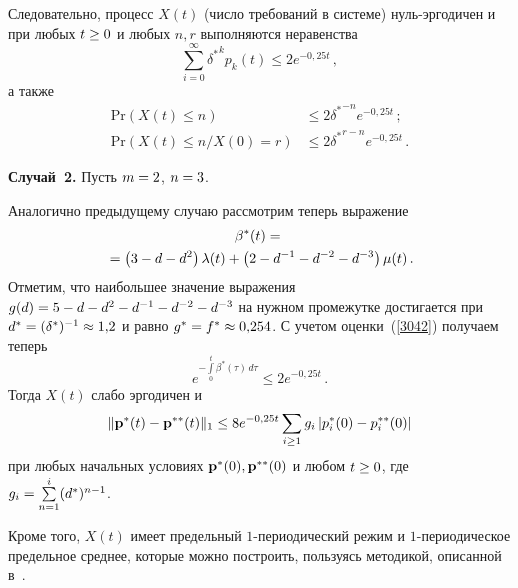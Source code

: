\begin{multicols}{2}
Следовательно, процесс $X(t)$ (число требований в системе) нуль-эр\-го\-ди\-чен 
и при любых $t \hm\ge 0$ и любых $n, r$
выполняются неравенства
\begin{equation*}
\sum\limits_{i=0}^{\infty} {\delta^*}^k p_k (t) \le
2e^{-0{,}25 t}\,,  
\end{equation*}
а также
\begin{align*}
\mathrm{Pr} \left(X(t)  \le n \right) &\le 2{\delta^*}^{-n}e^{-0{,}25 t}\,;\\
\mathrm{Pr} \left(X(t)  \le n / X(0) = r \right) &\le 2{\delta^*}^{r-n}e^{-0{,}25 t}\,.
\end{align*}


{\bf Случай~2.} Пусть $m \hm= 2$, $n\hm=3$.

Аналогично предыдущему случаю рассмотрим теперь выражение
\begin{multline*}
\beta^*(t) =  {}\\
{}=\left(3  -d -d^2\right)\lambda(t)  + \left(2 -d^{-1} -d^{-2} - d^{-3}\right)\mu(t)\,.
\end{multline*}
Отметим, что наибольшее значение выражения 
$g(d)\hm=5\hm-d \hm- d^2 \hm- d^{-1} \hm- d^{-2} \hm- d^{-3}$
на нужном промежутке достигается при $d^* \hm= (\delta^*)^{-1}\hm \approx 1{,}2$ 
и равно $g^* \hm= f^* \hm\approx 0{,}254$.
С учетом оценки~(\ref{3042}) получаем теперь
\begin{equation*}
e^{-\int\limits_0^t\beta^*(\tau)\,d\tau} \le 2 e^{- 0{,}25 t}\,.
\end{equation*}
Тогда  $X\left( t\right) $ слабо эргодичен  и
\begin{equation*}
\|{\mathbf p}^*(t)-{\mathbf p}^{**}(t)\|_{1} \le 8 e^{-0{,}25 t} 
\sum\limits_{i \ge 1} g_i\left|p_i^*(0)-p_i^{**}(0)\right| 
\end{equation*}
при любых начальных условиях ${\bf p^*}(0), {\bf p^{**}}(0)$ и 
любом $t \hm\ge 0$, где $g_i\hm=\sum\limits_{n=1}^{i}(d^*)^{n-1}$.

Кроме того, $X\left( t\right) $ имеет предельный $1$-пе\-рио\-ди\-че\-ский режим и 
$1$-пе\-рио\-ди\-че\-ское предельное среднее, которые можно построить, пользуясь 
методикой, описанной в~\cite{z12, z06}.

{\small\frenchspacing
{%
\begin{thebibliography}{99}




\end{thebibliography}}}
\end{multicols}

